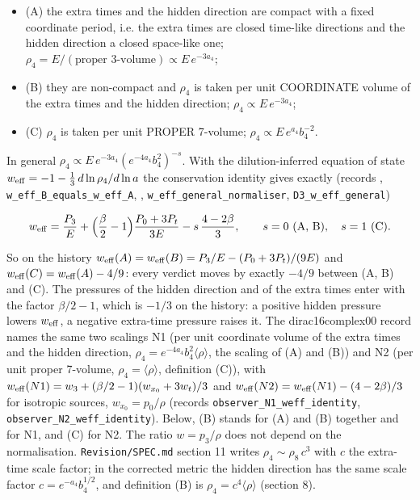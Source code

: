\documentclass[11pt]{article}
\begin{document}
\begin{itemize}
\item (A) the extra times and the hidden direction are compact with a fixed coordinate period, i.e. the extra times are closed time-like directions and the hidden direction a closed space-like one; $\rho_4 = E/(\text{proper 3-volume}) \propto E\,e^{-3a_4}$;
\item (B) they are non-compact and $\rho_4$ is taken per unit COORDINATE volume of the extra times and the hidden direction; $\rho_4 \propto E\,e^{-3a_4}$;
\item (C) $\rho_4$ is taken per unit PROPER 7-volume; $\rho_4 \propto E\,e^{a_4}b_4^{-2}$.
\end{itemize}

In general $\rho_4 \propto E\,e^{-3a_4}(e^{-4a_4}b_4^2)^{-s}$. With the dilution-inferred equation of state $w_{\rm eff} = -1 - \frac13\,d\ln\rho_4/d\ln a$ the conservation identity gives exactly (records \texttt{}, \texttt{w\_eff\_B\_\allowbreak{}equals\_w\allowbreak{}\_eff\_A}, \texttt{}, \texttt{w\_eff\_ge\allowbreak{}neral\_no\allowbreak{}rmaliser}, \texttt{D3\_w\_eff\allowbreak{}\_general})

\[
w_{\rm eff} = \frac{P_3}{E} + \Big(\frac{\beta}{2} - 1\Big)\frac{P_0 + 3P_t}{3E} - s\,\frac{4 - 2\beta}{3},\qquad s = 0\ \text{(A, B)},\quad s = 1\ \text{(C)} .
\]

So on the history $w_{\rm eff}(A) = w_{\rm eff}(B) = P_3/E - (P_0 + 3P_t)/(9E)$ and $w_{\rm eff}(C) = w_{\rm eff}(A) - 4/9$: every verdict moves by exactly $-4/9$ between (A, B) and (C). The pressures of the hidden direction and of the extra times enter with the factor $\beta/2 - 1$, which is $-1/3$ on the history: a positive hidden pressure lowers $w_{\rm eff}$, a negative extra-time pressure raises it. The dirac16complex00 record names the same two scalings N1 (per unit coordinate volume of the extra times and the hidden direction, $\rho_4 = e^{-4a_4}b_4^2\langle\rho\rangle$, the scaling of (A) and (B)) and N2 (per unit proper 7-volume, $\rho_4 = \langle\rho\rangle$, definition (C)), with $w_{\rm eff}(N1) = w_3 + (\beta/2 - 1)(w_{x_0} + 3w_t)/3$ and $w_{\rm eff}(N2) = w_{\rm eff}(N1) - (4 - 2\beta)/3$ for isotropic sources, $w_{x_0} = p_0/\rho$ (records \texttt{observer\allowbreak{}\_N1\_weff\allowbreak{}\_identit\allowbreak{}y}, \texttt{observer\allowbreak{}\_N2\_weff\allowbreak{}\_identit\allowbreak{}y}). Below, (B) stands for (A) and (B) together and for N1, and (C) for N2. The ratio $w = p_3/\rho$ does not depend on the normalisation. \texttt{Revision\allowbreak{}/SPEC.md} section 11 writes $\rho_4 \sim \rho_8\,c^3$ with $c$ the extra-time scale factor; in the corrected metric the hidden direction has the same scale factor $c = e^{-a_4}b_4^{1/2}$, and definition (B) is $\rho_4 = c^4\langle\rho\rangle$ (section 8).
\end{document}
